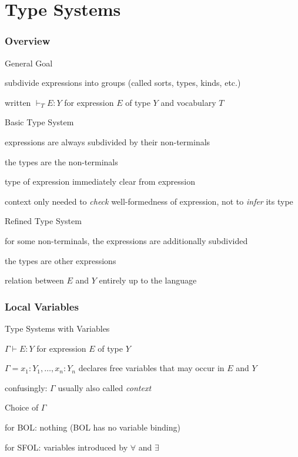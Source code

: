 \section{Type Systems}

\begin{frame}\frametitle{Overview}
\begin{blockitems}{General Goal}
\item subdivide expressions into groups (called sorts, types, kinds, etc.)
\item written $\vdash_T E:Y$ for expression $E$ of type $Y$ and vocabulary $T$
\end{blockitems}

\begin{blockitems}{Basic Type System}
\item expressions are always subdivided by their non-terminals
\item the types are the non-terminals
\item type of expression immediately clear from expression
\item context only needed to \emph{check} well-formedness of expression, not to \emph{infer} its type
\end{blockitems}

\begin{blockitems}{Refined Type System}
\item for some non-terminals, the expressions are additionally subdivided
\item the types are other expressions
\item relation between $E$ and $Y$ entirely up to the language
\end{blockitems}
\end{frame}

\begin{frame}\frametitle{Local Variables}
\begin{blockitems}{Type Systems with Variables}
\item $\Gamma\vdash E:Y$ for expression $E$ of type $Y$
\item $\Gamma=x_1:Y_1,\ldots,x_n:Y_n$ declares free variables that may occur in $E$ and $Y$
\item confusingly: $\Gamma$ usually also called \emph{context}
\end{blockitems}

\begin{blockitems}{Choice of $\Gamma$}
\item for BOL: nothing (BOL has no variable binding)
\item for SFOL: variables introduced by $\forall$ and $\exists$
\end{blockitems}
\end{frame}

